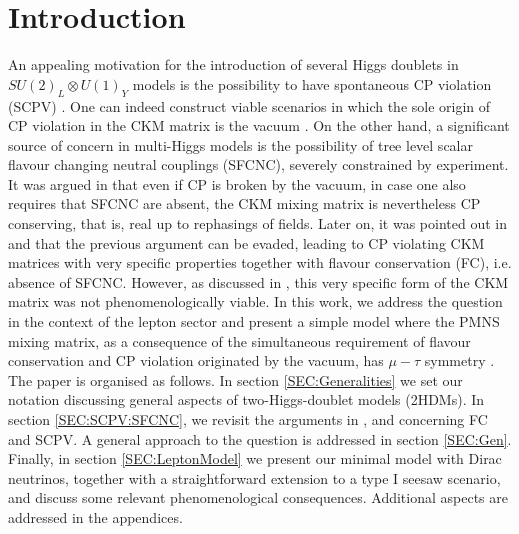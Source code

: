 \documentclass[12pt,a4paper]{article}
\begin{document}
\newpage
\section{Introduction\label{SEC:Intro}}
An appealing motivation for the introduction of several Higgs doublets in $SU(2)_L\otimes U(1)_Y$ models is the possibility to have spontaneous CP violation (SCPV) \cite{Lee:1973iz,Lee:1974jb}. One can indeed construct viable scenarios in which the sole origin of CP violation in the CKM matrix is the vacuum \cite{Nebot:2018nqn}. On the other hand, a significant source of concern in multi-Higgs models is the possibility of tree level scalar flavour changing neutral couplings (SFCNC), severely constrained by experiment. It was argued in \cite{Branco:1979pv} that even if CP is broken by the vacuum, in case one also requires that SFCNC are absent, the CKM mixing matrix is nevertheless CP conserving, that is, real up to rephasings of fields. Later on, it was pointed out in \cite{Ecker:1987md} and \cite{Gronau:1987xz} that the previous argument can be evaded, leading to CP violating CKM matrices with very specific properties together with flavour conservation (FC), i.e. absence of SFCNC. However, as discussed in \cite{Ecker:1987md}, this very specific form of the CKM matrix was not phenomenologically viable. In this work, we address the question in the context of the lepton sector and present a simple model where the PMNS mixing matrix, as a consequence of the simultaneous requirement of flavour conservation and CP violation originated by the vacuum, has $\mu-\tau$ symmetry \cite{Harrison:2002et}. The paper is organised as follows. In section \ref{SEC:Generalities} we set our notation discussing general aspects of two-Higgs-doublet models (2HDMs). In section \ref{SEC:SCPV:SFCNC}, we revisit the arguments in \cite{Branco:1979pv}, \cite{Ecker:1987md} and \cite{Gronau:1987xz} concerning FC and SCPV. A general approach to the question is addressed in section \ref{SEC:Gen}. Finally, in section \ref{SEC:LeptonModel} we present our minimal model with Dirac neutrinos, together with a straightforward extension to a type I seesaw scenario, and discuss some relevant phenomenological consequences. Additional aspects are addressed in the appendices.

\end{document}
